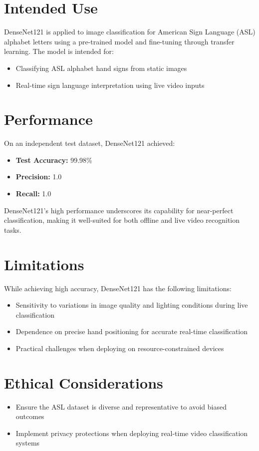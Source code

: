 \documentclass[12pt, a4paper]{article}
\begin{document}
\section{Intended Use}
DenseNet121 is applied to image classification for American Sign Language (ASL) alphabet letters using a pre-trained model and fine-tuning through transfer learning. The model is intended for:
\begin{itemize}
    \item Classifying ASL alphabet hand signs from static images
    \item Real-time sign language interpretation using live video inputs
\end{itemize}

\section{Performance}
On an independent test dataset, DenseNet121 achieved:
\begin{itemize}
    \item \textbf{Test Accuracy:} 99.98\%
    \item \textbf{Precision:} 1.0
    \item \textbf{Recall:} 1.0
\end{itemize}
DenseNet121’s high performance underscores its capability for near-perfect classification, making it well-suited for both offline and live video recognition tasks.

\section{Limitations}
While achieving high accuracy, DenseNet121 has the following limitations:
\begin{itemize}
    \item Sensitivity to variations in image quality and lighting conditions during live classification
    \item Dependence on precise hand positioning for accurate real-time classification
    \item Practical challenges when deploying on resource-constrained devices
\end{itemize}

\section{Ethical Considerations}
\begin{itemize}
    \item Ensure the ASL dataset is diverse and representative to avoid biased outcomes
    \item Implement privacy protections when deploying real-time video classification systems
\end{itemize}



\end{document}
